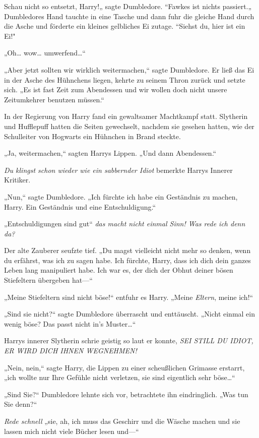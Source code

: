 {Schau nicht so entsetzt, Harry!„ sagte Dumbledore. “Fawkes ist nichts passiert.„ Dumbledores Hand tauchte in eine Tasche und dann fuhr die gleiche Hand durch die Asche und förderte ein kleines gelbliches Ei zutage. “Siehst du, hier ist ein Ei!"

„Oh… wow… umwerfend…“

„Aber jetzt sollten wir wirklich weitermachen,“ sagte Dumbledore. Er ließ das Ei in der Asche des Hühnchens liegen, kehrte zu seinem Thron zurück und setzte sich. „Es ist fast Zeit zum Abendessen und wir wollen doch nicht unsere Zeitumkehrer benutzen müssen.“

In der Regierung von Harry fand ein gewaltsamer Machtkampf statt. Slytherin und Hufflepuff hatten die Seiten gewechselt, nachdem sie gesehen hatten, wie der Schulleiter von Hogwarts ein Hühnchen in Brand steckte.

„Ja, weitermachen,“ sagten Harrys Lippen. „Und dann Abendessen.“

\emph{Du klingst schon wieder wie ein sabbernder Idiot} bemerkte Harrys Innerer Kritiker.

„Nun,“ sagte Dumbledore. „Ich fürchte ich habe ein Geständnis zu machen, Harry. Ein Geständnis und eine Entschuldigung.“

„Entschuldigungen sind gut“ \emph{das macht nicht einmal Sinn! Was rede ich denn da?}

Der alte Zauberer seufzte tief. „Du magst vielleicht nicht mehr so denken, wenn du erfährst, was ich zu sagen habe. Ich fürchte, Harry, dass ich dich dein ganzes Leben lang manipuliert habe. Ich war es, der dich der Obhut deiner bösen Stiefeltern übergeben hat—“

„Meine Stiefeltern sind nicht böse!“ entfuhr es Harry. „Meine \emph{Eltern}, meine ich!“

„Sind sie nicht?“ sagte Dumbledore überrascht und enttäuscht. „Nicht einmal ein wenig böse? Das passt nicht in's Muster…“

Harrys innerer Slytherin schrie geistig so laut er konnte, \emph{SEI STILL DU IDIOT, ER WIRD DICH IHNEN WEGNEHMEN!}

„Nein, nein,“ sagte Harry, die Lippen zu einer scheußlichen Grimasse erstarrt, „ich wollte nur Ihre Gefühle nicht verletzen, sie sind eigentlich sehr böse…“

„Sind Sie?“ Dumbledore lehnte sich vor, betrachtete ihn eindringlich. „Was tun Sie denn?“

\emph{Rede schnell} „sie, ah, ich muss das Geschirr und die Wäsche machen und sie lassen mich nicht viele Bücher lesen und—“

}
